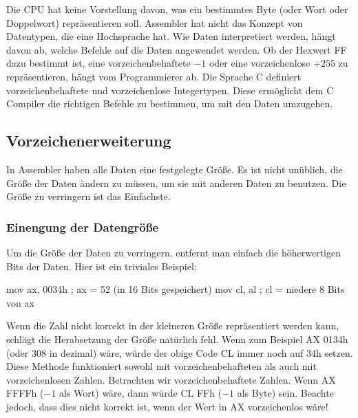 Die CPU hat keine Vorstellung davon, was ein bestimmtes Byte (oder
Wort oder Doppelwort) repr\"{a}sentieren soll. Assembler hat nicht das
Konzept von Datentypen, die eine Hochsprache hat. Wie Daten
interpretiert werden, h\"{a}ngt davon ab, welche Befehle auf die Daten
angewendet werden. Ob der Hexwert FF dazu bestimmt ist, eine
vorzeichenbehaftete $-1$ oder eine vorzeichenlose $+255$ zu
repr\"{a}sentieren, h\"{a}ngt vom Programmierer ab. Die Sprache C definiert
vorzeichenbehaftete und vorzeichenlose Integertypen. Diese
erm\"{o}glicht dem C Compiler die richtigen Befehle zu bestimmen, um mit
den Daten umzugehen.


\subsection{Vorzeichenerweiterung }

In Assembler haben alle Daten eine festgelegte Gr\"{o}{\ss}e. Es ist nicht
un\-\"{u}b\-lich, die Gr\"{o}{\ss}e der Daten \"{a}ndern zu m\"{u}ssen, um sie mit
anderen Daten zu benutzen. Die Gr\"{o}{\ss}e zu verringern ist das
Einfachste.

\subsubsection{Einengung der Datengr\"{o}{\ss}e}

Um die Gr\"{o}{\ss}e der Daten zu verringern, entfernt man einfach die
h\"{o}herwertigen Bits der Daten. Hier ist ein triviales Beispiel:
\begin{AsmCodeListing}[numbers=left, frame=none]
      mov    ax, 0034h        ; ax = 52 (in 16 Bits gespeichert)
      mov    cl, al           ; cl = niedere 8 Bits von ax
\end{AsmCodeListing}

Wenn die Zahl nicht korrekt in der kleineren Gr\"{o}{\ss}e repr\"{a}sentiert
werden kann, schl\"{a}gt die Herabsetzung der Gr\"{o}{\ss}e nat\"{u}rlich fehl. Wenn
zum Beispiel {\code AX} 0134h (oder 308 in dezimal) w\"{a}re, w\"{u}rde der
obige Code {\code CL} immer noch auf 34h setzen. Diese Methode
funktioniert sowohl mit vorzeichenbehafteten als auch mit
vorzeichenlosen Zahlen. Betrachten wir vorzeichenbehaftete Zahlen.
Wenn {\code AX} FFFFh ($-1$ als Wort) w\"{a}re, dann w\"{u}rde {\code CL}
FFh ($-1$ als Byte) sein. Beachte jedoch, dass dies nicht korrekt
ist, wenn der Wert in {\code AX} vorzeichenlos w\"{a}re!

